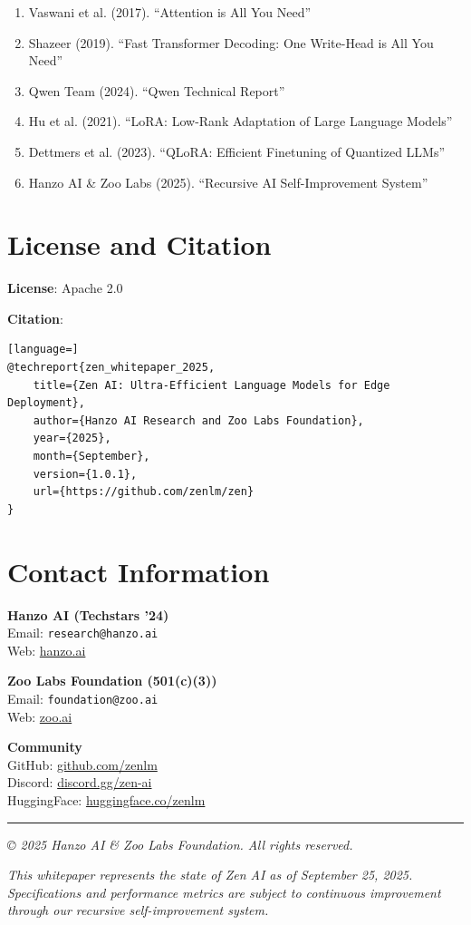 \documentclass[11pt,a4paper]{article}
\begin{document}
\begin{enumerate}
    \item Vaswani et al. (2017). ``Attention is All You Need''
    \item Shazeer (2019). ``Fast Transformer Decoding: One Write-Head is All You Need''
    \item Qwen Team (2024). ``Qwen Technical Report''
    \item Hu et al. (2021). ``LoRA: Low-Rank Adaptation of Large Language Models''
    \item Dettmers et al. (2023). ``QLoRA: Efficient Finetuning of Quantized LLMs''
    \item Hanzo AI \& Zoo Labs (2025). ``Recursive AI Self-Improvement System''
\end{enumerate}

\section*{License and Citation}

\textbf{License}: Apache 2.0

\textbf{Citation}:
\begin{lstlisting}[language=]
@techreport{zen_whitepaper_2025,
    title={Zen AI: Ultra-Efficient Language Models for Edge Deployment},
    author={Hanzo AI Research and Zoo Labs Foundation},
    year={2025},
    month={September},
    version={1.0.1},
    url={https://github.com/zenlm/zen}
}
\end{lstlisting}

\section*{Contact Information}

\textbf{Hanzo AI (Techstars '24)} \\
Email: \texttt{research@hanzo.ai} \\
Web: \href{https://hanzo.ai}{hanzo.ai}

\textbf{Zoo Labs Foundation (501(c)(3))} \\
Email: \texttt{foundation@zoo.ai} \\
Web: \href{https://zoo.ai}{zoo.ai}

\textbf{Community} \\
GitHub: \href{https://github.com/zenlm}{github.com/zenlm} \\
Discord: \href{https://discord.gg/zen-ai}{discord.gg/zen-ai} \\
HuggingFace: \href{https://huggingface.co/zenlm}{huggingface.co/zenlm}

\vspace{1cm}
\noindent\rule{\textwidth}{0.4pt}

\noindent\emph{\copyright{} 2025 Hanzo AI \& Zoo Labs Foundation. All rights reserved.}

\noindent\emph{This whitepaper represents the state of Zen AI as of September 25,
2025. Specifications and performance metrics are subject to continuous
improvement through our recursive self-improvement system.}
\end{document}
